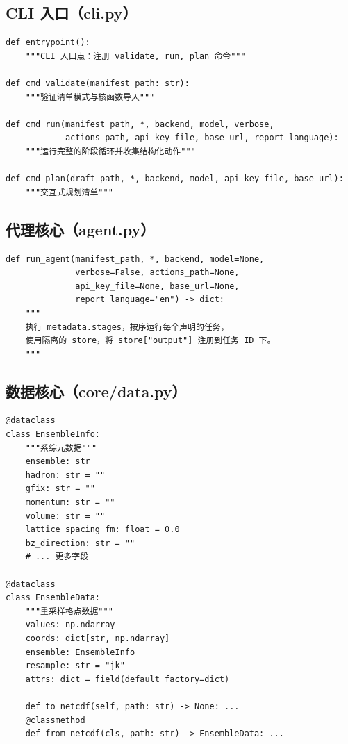 \documentclass[12pt,a4paper]{ctexart}
\begin{document}
\subsection{CLI 入口（cli.py）}

\begin{lstlisting}[style=pycode]
def entrypoint():
    """CLI 入口点：注册 validate, run, plan 命令"""

def cmd_validate(manifest_path: str):
    """验证清单模式与核函数导入"""

def cmd_run(manifest_path, *, backend, model, verbose,
            actions_path, api_key_file, base_url, report_language):
    """运行完整的阶段循环并收集结构化动作"""

def cmd_plan(draft_path, *, backend, model, api_key_file, base_url):
    """交互式规划清单"""
\end{lstlisting}

\subsection{代理核心（agent.py）}

\begin{lstlisting}[style=pycode]
def run_agent(manifest_path, *, backend, model=None,
              verbose=False, actions_path=None,
              api_key_file=None, base_url=None,
              report_language="en") -> dict:
    """
    执行 metadata.stages，按序运行每个声明的任务，
    使用隔离的 store，将 store["output"] 注册到任务 ID 下。
    """
\end{lstlisting}

\subsection{数据核心（core/data.py）}

\begin{lstlisting}[style=pycode]
@dataclass
class EnsembleInfo:
    """系综元数据"""
    ensemble: str
    hadron: str = ""
    gfix: str = ""
    momentum: str = ""
    volume: str = ""
    lattice_spacing_fm: float = 0.0
    bz_direction: str = ""
    # ... 更多字段

@dataclass
class EnsembleData:
    """重采样格点数据"""
    values: np.ndarray
    coords: dict[str, np.ndarray]
    ensemble: EnsembleInfo
    resample: str = "jk"
    attrs: dict = field(default_factory=dict)

    def to_netcdf(self, path: str) -> None: ...
    @classmethod
    def from_netcdf(cls, path: str) -> EnsembleData: ...
\end{lstlisting}
\end{document}
